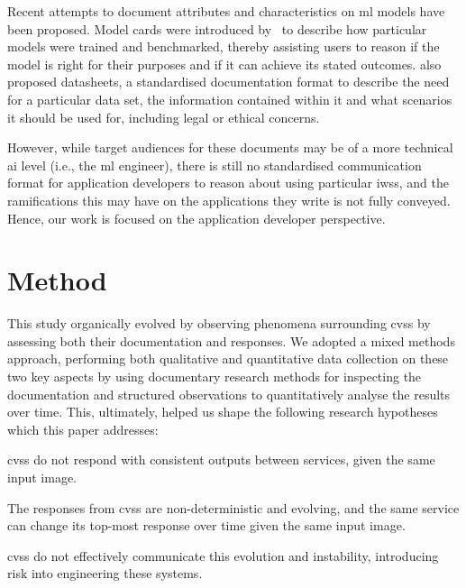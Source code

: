 Recent attempts to document attributes and characteristics on \gls{ml} models have been proposed. Model cards were introduced by~\citet{Mitchell:2018in} to describe how particular models were trained and benchmarked, thereby assisting users to reason if the model is right for their purposes and if it can achieve its stated outcomes. \citet{Gebru:2018wh} also proposed datasheets, a standardised documentation format to describe the need for a particular data set, the information contained within it and what scenarios it should be used for, including legal or ethical concerns. 

However, while target audiences for these documents may be of a more technical \gls{ai} level (i.e., the \gls{ml} engineer), there is still no standardised communication format for application developers to reason about using particular \glspl{iws}, and the ramifications this may have on the applications they write is not fully conveyed. Hence, our work is focused on the application developer perspective. 

\section{Method}
\label{icsme2019:sec:method}

This study organically evolved by observing phenomena surrounding \glspl{cvs} by assessing both their documentation and responses. We adopted a mixed methods approach, performing both qualitative and quantitative data collection on these two key aspects by using documentary research methods for inspecting the documentation and structured observations to quantitatively analyse the results over time. This, ultimately, helped us shape the following research hypotheses which this paper addresses:

\begin{framed}
\begin{enumerate}[label=\textbf{[RH\arabic*]}, leftmargin=2\parindent]
\item \glspl{cvs} do not respond with consistent outputs between services, given the same input image.
\item The responses from \glspl{cvs} are non-deterministic and evolving, and the same service can change its top-most response over time given the same input image.
\item \glspl{cvs} do not effectively communicate this evolution and instability, introducing risk into engineering these systems.
\end{enumerate}
\end{framed}


